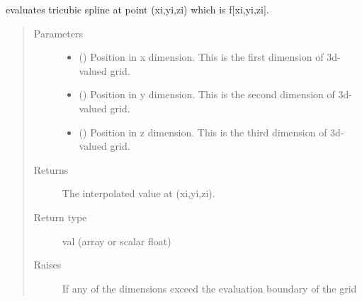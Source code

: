 \documentclass[letterpaper,10pt,english]{sphinxmanual}
\begin{document}
\begin{fulllineitems}
\begin{fulllineitems}
\label{\detokenize{eqtools:eqtools.trispline.Spline.ev}}
evaluates tricubic spline at point (xi,yi,zi) which is f{[}xi,yi,zi{]}.
\begin{quote}\begin{description}
\item[{Parameters}] \leavevmode\begin{itemize}
\item {} 
 () \textendash{} Position in x dimension.
This is the first dimension of 3d-valued grid.

\item {} 
 () \textendash{} Position in y dimension.
This is the second dimension of 3d-valued grid.

\item {} 
 () \textendash{} Position in z dimension.
This is the third dimension of 3d-valued grid.

\end{itemize}

\item[{Returns}] \leavevmode
The interpolated value at (xi,yi,zi).

\item[{Return type}] \leavevmode
val (array or scalar float)

\item[{Raises}] \leavevmode
{} \textendash{} If any of the dimensions exceed the evaluation boundary
    of the grid

\end{description}\end{quote}

\end{fulllineitems}


\end{fulllineitems}
\end{document}
